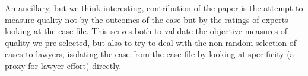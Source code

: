 \documentclass[oneside,12pt]{article}
\begin{document}
An ancillary, but we think interesting, contribution of the paper is the attempt to measure quality not by the outcomes of the case but by the ratings of experts looking at the case file. This serves both to validate the objective measures of quality we pre-selected, but also to try to deal with the non-random selection of cases to lawyers, isolating the case from the case file by looking at specificity (a proxy for lawyer effort) directly.





\nocite{*}





\clearpage

\onehalfspacing









\clearpage








\clearpage
\end{document}
